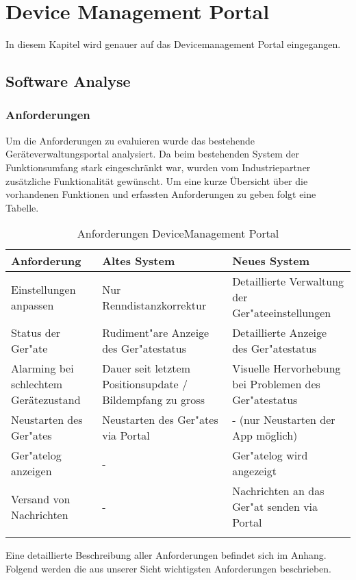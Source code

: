 \chapter{Device Management Portal}

In diesem Kapitel wird genauer auf das Devicemanagement Portal eingegangen.

\section{Software Analyse}

\subsection{Anforderungen}
Um die Anforderungen zu evaluieren wurde das bestehende Geräteverwaltungsportal analysiert. Da beim bestehenden System der Funktionsumfang stark eingeschränkt war, wurden vom Industriepartner zusätzliche Funktionalität gewünscht.
Um eine kurze Übersicht über die vorhandenen Funktionen und erfassten Anforderungen zu geben folgt  eine Tabelle.

{\renewcommand{\arraystretch}{2}%
    \begin{longtable}{  p{3.5cm} | p{4.3cm} | p{4.3cm} }

    \textbf{Anforderung} & \textbf{Altes System} & \textbf{Neues System} \\ \hline
\hline
    Einstellungen anpassen & Nur Renndistanzkorrektur & Detaillierte Verwaltung der Ger"{a}teeinstellungen \\ \hline
    Status der Ger"{a}te & Rudiment"{a}re Anzeige des Ger"{a}testatus & Detaillierte Anzeige des Ger"{a}testatus \\
    \hline
     Alarming bei schlechtem Gerätezustand & Dauer seit letztem Positionsupdate / Bildempfang zu gross & Visuelle Hervorhebung bei Problemen des Ger"{a}testatus \\
    \hline
    Neustarten des Ger"{a}tes & Neustarten des Ger"{a}tes via Portal & - (nur Neustarten der App möglich)\\
    \hline
    Ger"{a}telog anzeigen & - & Ger"{a}telog wird angezeigt\\
    \hline
    Versand von Nachrichten & - & Nachrichten an das Ger"{a}t senden via Portal\\

\caption{Anforderungen DeviceManagement Portal}
\end{longtable}}

Eine detaillierte Beschreibung aller Anforderungen befindet sich im Anhang. Folgend werden die aus unserer Sicht wichtigsten Anforderungen beschrieben.

